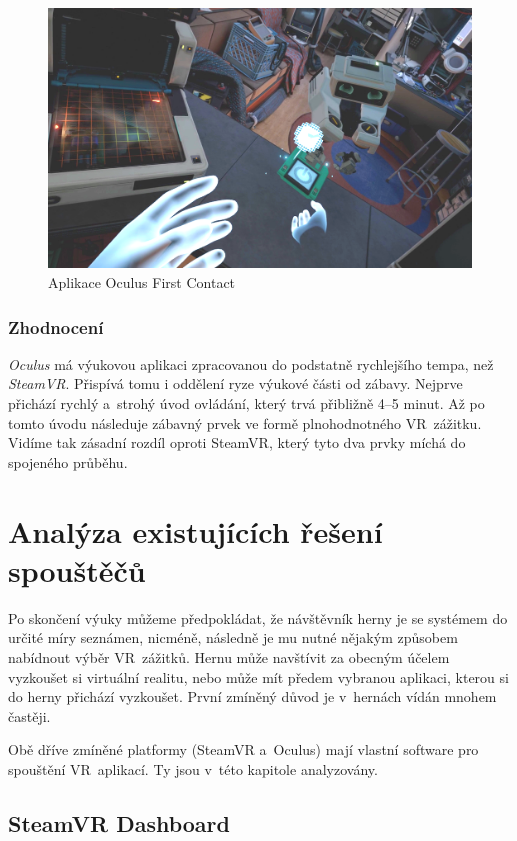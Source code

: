 \begin{figure}[h!]
\centering
\includegraphics[width=12cm]{src/assets/oculus-first-contact.png}
\caption{Aplikace Oculus First Contact}
\end{figure}

\subsubsection{Zhodnocení}\label{zhodnocenuxed-1}

\emph{Oculus} má výukovou aplikaci zpracovanou do podstatně rychlejšího
tempa, než \emph{SteamVR}. Přispívá tomu i oddělení ryze výukové části od zábavy. Nejprve přichází rychlý a~strohý úvod ovládání, který trvá
přibližně 4--5 minut. Až po tomto úvodu následuje zábavný prvek
ve formě plnohodnotného VR~zážitku. Vidíme tak zásadní rozdíl oproti
SteamVR, který tyto dva prvky míchá do spojeného průběhu.

\section{Analýza existujících řešení
spouštěčů}\label{analuxfdza-existujuxedcuxedch-ux159eux161enuxed-spouux161tux11bux10dux16f}

Po skončení výuky můžeme předpokládat, že návštěvník herny je se
systémem do určité míry seznámen, nicméně, následně je mu nutné nějakým způsobem
nabídnout výběr VR~zážitků. Hernu může navštívit za obecným účelem vyzkoušet si virtuální realitu, nebo může mít předem vybranou aplikaci, kterou si do herny přichází vyzkoušet. První
zmíněný důvod je v~hernách vídán mnohem častěji.

Obě dříve zmíněné platformy (SteamVR a~Oculus) mají
vlastní software pro spouštění VR~aplikací. Ty jsou v~této kapitole
analyzovány.

\subsection{SteamVR Dashboard}\label{steamvr-dashboard}

